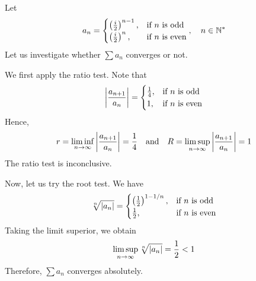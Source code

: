 \documentclass[thmcnt=section, 12pt]{my-elegantbook}
\begin{document}

\begin{example}
    Let
    \begin{align*}
        a_n = \begin{cases}
            \left( \frac{i}{2} \right)^{n-1},
            &\text{if $n$ is odd} \\ 
            \left( \frac{i}{2} \right)^{n},
            &\text{if $n$ is even} \\ 
        \end{cases},
        \quad n \in \mathbb{N}^\ast
    \end{align*}
    Let us investigate whether $\sum a_n$ converges or not. 

    We first apply the ratio test. Note that 
    \begin{align*}
        \left\lvert \frac{a_{n+1}}{a_n} \right\rvert = 
        \begin{cases}
            \frac{1}{4},
            &\text{if $n$ is odd} \\ 
            1,
            &\text{if $n$ is even} \\ 
        \end{cases}
    \end{align*}
    Hence, 
    \begin{align*}
        r = \liminf_{n \to \infty} \left\lvert \frac{a_{n+1}}{a_n} \right\rvert 
        = \frac{1}{4}
        \quad \text{and} \quad 
        R = \limsup_{n \to \infty} \left\lvert \frac{a_{n+1}}{a_n} \right\rvert 
        = 1
    \end{align*}
    The ratio test is inconclusive.

    Now, let us try the root test. We have 
    \begin{align*}
        \sqrt[n]{\left\lvert a_n \right\rvert} = 
        \begin{cases}
            \left( \frac{1}{2} \right)^{1 - 1 / n},
            &\text{if $n$ is odd} \\ 
            \frac{1}{2},
            &\text{if $n$ is even} \\ 
        \end{cases}
    \end{align*}
    Taking the limit superior, we obtain
    \begin{align*}
        \limsup_{n \to \infty} \sqrt[n]{\left\lvert a_n \right\rvert}
        = \frac{1}{2} < 1
    \end{align*}
    Therefore, $\sum a_n$ converges absolutely.
\end{example}

\end{document}
